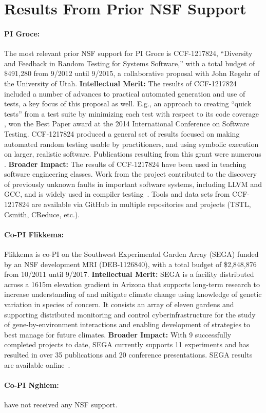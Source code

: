\section{Results From Prior NSF Support}

\paragraph{PI Groce:}
The most relevant prior NSF support for PI Groce is
CCF-1217824, ``Diversity and Feedback in Random Testing for Systems
Software,'' with a total budget of \$491,280 from 9/2012 until 9/2015,
a collaborative proposal with John Regehr of the University of
Utah. {\bf Intellectual Merit:} The results of CCF-1217824 included a
number of advances to practical automated generation and use of tests,
a key focus of this proposal as well.  E.g., an approach to creating ``quick
tests'' from a test suite by minimizing each
test with respect to its code coverage \cite{icst2014}, won the
Best Paper award at the 2014 International Conference on Software
Testing.  CCF-1217824
produced a general set of results focused on making automated random
testing usable by practitioners, and using symbolic execution on
larger, realistic software.  Publications resulting from this grant
were numerous
\cite{Onward14,PLDI13,issta14,icst2014,helphelp,DirectedSwarm,stvrcausereduce,tstlsttt,ISSTA15,ASEAdeq}. {\bf
  Broader
  Impact:} The results of CCF-1217824 have been used in teaching software
engineering classes.
Work from the project contributed to the discovery of previously
unknown faults in important software
systems, including LLVM and GCC, and is widely used in compiler
testing~\cite{ZhendongPLDI14,beginnerluck,dewey2015fuzzing,le2015randomized}.
Tools and data sets from CCF-1217824 are available via GitHub in
multiple repositories and projects (TSTL, Csmith, CReduce, etc.).

\paragraph{Co-PI Flikkema:} Flikkema is co-PI on the Southwest Experimental Garden Array (SEGA)
funded by an NSF development MRI
(DEB-1126840), with a total budget of \$2,848,876 from 10/2011 until
9/2017. {\bf Intellectual Merit:} SEGA is a facility
distributed across a 1615m elevation gradient in Arizona that supports
long-term research to increase understanding of and mitigate climate
change using knowledge of genetic variation in species of concern. It
consists an array of eleven gardens and supporting distributed
monitoring and control cyberinfrastructure for the study of
gene-by-environment interactions and enabling development of
strategies to best manage for future climates. {\bf Broader
  Impact:}  With 9 successfully completed projects to date, SEGA
currently supports 11 experiments and has resulted in over 35
publications and 20 conference presentations.  SEGA results are
available online~\cite{SEGA}.

\paragraph{Co-PI Nghiem:} have not received any NSF support.
